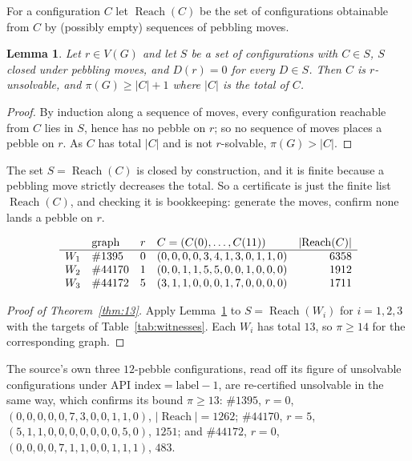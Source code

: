 \documentclass[11pt]{amsart}
\newtheorem{lemma}[theorem]{Lemma}
\theoremstyle{remark}
\newcommand{\HoG}[1]{\#\mathrm{#1}}
\newcommand{\Reach}{\operatorname{Reach}}
\begin{document}
For a configuration $C$ let $\Reach(C)$ be the set of configurations obtainable
from $C$ by (possibly empty) sequences of pebbling moves.

\begin{lemma}\label{lem:cert}
Let $r\in V(G)$ and let $S$ be a set of configurations with $C\in S$, $S$ closed
under pebbling moves, and $D(r)=0$ for every $D\in S$. Then $C$ is
$r$-unsolvable, and $\pi(G)\ge\lvert C\rvert+1$ where $\lvert C\rvert$ is the
total of $C$.
\end{lemma}

\begin{proof}
By induction along a sequence of moves, every configuration reachable from $C$
lies in $S$, hence has no pebble on $r$; so no sequence of moves places a pebble
on $r$. As $C$ has total $\lvert C\rvert$ and is not $r$-solvable, $\pi(G)>\lvert
C\rvert$.
\end{proof}

The set $S=\Reach(C)$ is closed by construction, and it is finite because a
pebbling move strictly decreases the total. So a certificate is just the finite
list $\Reach(C)$, and checking it is bookkeeping: generate the moves, confirm
none lands a pebble on $r$.

\begin{table}[ht]
\caption{The three witnesses. Each has total $13$ and $C(r)=0$, and each
$\Reach(C)$ is closed under moves and free of pebbles on $r$.}
\label{tab:witnesses}
\[
\begin{array}{clcl r}
 & \text{graph} & r & C=(C(0),\dots,C(11)) & \lvert\Reach(C)\rvert\\\hline
W_1 & \HoG{1395}  & 0 & (0,0,0,0,3,4,1,3,0,1,1,0) & 6358\\
W_2 & \HoG{44170} & 1 & (0,0,1,1,5,5,0,0,1,0,0,0) & 1912\\
W_3 & \HoG{44172} & 5 & (3,1,1,0,0,0,1,7,0,0,0,0) & 1711
\end{array}
\]
\end{table}

\begin{proof}[Proof of Theorem~\ref{thm:13}]
Apply Lemma~\ref{lem:cert} to $S=\Reach(W_i)$ for $i=1,2,3$ with the targets of
Table~\ref{tab:witnesses}. Each $W_i$ has total $13$, so
$\pi\ge14$ for the corresponding graph.
\end{proof}

\begin{sloppypar}
The source's own three $12$-pebble configurations, read off its figure of
unsolvable configurations under $\text{API index}=\text{label}-1$, are
re-certified unsolvable in the same way, which confirms its bound $\pi\ge13$:
$\HoG{1395}$, $r=0$, $(0,0,0,0,0,7,3,0,0,1,1,0)$, $\lvert\Reach\rvert=1262$;
$\HoG{44170}$, $r=5$, $(5,1,1,0,0,0,0,0,0,0,5,0)$, $1251$; and $\HoG{44172}$,
$r=0$, $(0,0,0,0,7,1,1,0,0,1,1,1)$, $483$.
\end{sloppypar}
\end{document}
